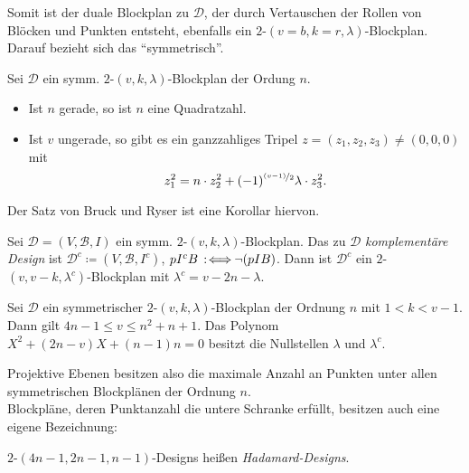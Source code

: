 \documentclass{cheat-sheet}
\newcommand{\Design}{\mathcal{D}} %
\newcommand{\Blocks}{\mathcal{B}} %
\begin{document}
\begin{bem}
  Somit ist der duale Blockplan zu $\Design$, der durch Vertauschen der Rollen von Blöcken und Punkten entsteht, ebenfalls ein $2$-$(v = b, k = r, \lambda)$-Blockplan.
  Darauf bezieht sich das "`symmetrisch"'.
\end{bem}

\begin{satz}
  Sei $\Design$ ein symm. $2$-$(v, k, \lambda)$-Blockplan der Ordung $n$.
  \begin{itemize}
    \item Ist $n$ gerade, so ist $n$ eine Quadratzahl.
    \item Ist $v$ ungerade, so gibt es ein ganzzahliges Tripel $z = (z_1, z_2, z_3) \neq (0, 0, 0)$ mit
    \[ z_1^2 = n \cdot z_2^2 + (-1)^{\nicefrac{(v-1)}{2}} \lambda \cdot z_3^2. \]
  \end{itemize}
\end{satz}

\begin{bem}
  Der Satz von Bruck und Ryser ist eine Korollar hiervon.
\end{bem}

\begin{bem}
  Sei $\Design = (V, \Blocks, I)$ ein symm. $2$-$(v, k, \lambda)$-Blockplan.
  Das zu $\Design$ \emph{komplementäre Design} ist $\Design^c \coloneqq (V, \Blocks, I^c)$, $p I^c B \!\!\enspace:\!\iff\!\! \neg (p I B)$.
  Dann ist $\Design^c$ ein $2$-$(v, v-k, \lambda^c)$-Blockplan mit $\lambda^c = v - 2n - \lambda$.
\end{bem}

\begin{satz}
  Sei $\Design$ ein symmetrischer $2$-$(v, k, \lambda)$-Blockplan der Ordnung $n$ mit $1 < k < v - 1$.
  Dann gilt \enspace
  $4n - 1 \leq v \leq n^2 + n + 1$.
  Das Polynom $X^2 + (2n - v) X + (n-1) n = 0$ besitzt die Nullstellen $\lambda$ und $\lambda^c$.
\end{satz}

\begin{bem}
  Projektive Ebenen besitzen also die maximale Anzahl an Punkten unter allen symmetrischen Blockplänen der Ordnung $n$. \\
  Blockpläne, deren Punktanzahl die untere Schranke erfüllt, besitzen auch eine eigene Bezeichnung:
\end{bem}

\begin{defn}
  $2$-$(4n{-}1, 2n{-}1, n{-}1)$-Designs heißen \emph{Hadamard-Designs}.
\end{defn}
\end{document}
